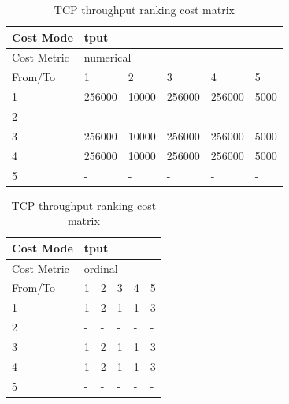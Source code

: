 \begin{table}[H]
\begin{subtable}{.65\linewidth}
        \centering
        \hspace{-4em}
        \begin{tabular}{|l|l|l|l|l|l|}
        \hline
        Cost Mode   & \multicolumn{5}{|l|}{tput}                       \\ \hline
        Cost Metric & \multicolumn{5}{|l|}{numerical}                  \\ \hline
        From/To     & 1         & 2     & 3        & 4        & 5      \\ \hline
        1           & 256000    & 10000 & 256000   & 256000   & 5000   \\ \hline
        2           & -         & -     & -        & -        & -      \\ \hline
        3           & 256000    & 10000 & 256000   & 256000   & 5000   \\ \hline
        4           & 256000    & 10000 & 256000   & 256000   & 5000   \\ \hline
        5           & -         & -     & -        & -        & -      \\ \hline
        \end{tabular}
    \caption{TCP throughput cost matrix}
    \label{table:cost-throughput-numerical}
    \end{subtable}
    \begin{subtable}{.30\linewidth}
        \centering
        \begin{tabular}{|l|l|l|l|l|l|}
        \hline
        Cost Mode   & \multicolumn{5}{|l|}{tput}                       \\ \hline
        Cost Metric & \multicolumn{5}{|l|}{ordinal}                    \\ \hline
        From/To     & 1         & 2     & 3        & 4        & 5      \\ \hline
        1           & 1         & 2     & 1        & 1        & 3      \\ \hline
        2           & -         & -     & -        & -        & -      \\ \hline
        3           & 1         & 2     & 1        & 1        & 3      \\ \hline
        4           & 1         & 2     & 1        & 1        & 3      \\ \hline
        5           & -         & -     & -        & -        & -      \\ \hline
        \end{tabular}
    \caption{TCP throughput ranking cost matrix}

\end{subtable}
\end{table}
